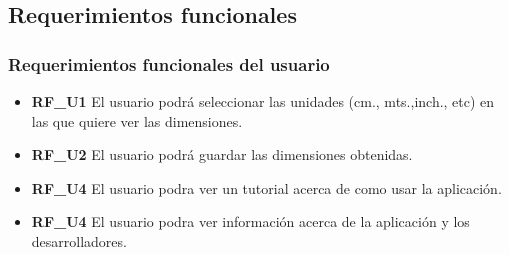 \subsection{Requerimientos funcionales}
\subsubsection{Requerimientos funcionales del usuario}

\begin{itemize}
\item \textbf{RF\_U1} El usuario podrá seleccionar las unidades (cm., mts.,inch., etc) en las que quiere ver las dimensiones.
\item \textbf{RF\_U2} El usuario podrá guardar las dimensiones obtenidas.


\item \textbf{RF\_U4} El usuario podra ver un tutorial acerca de como usar la aplicación.
\item \textbf{RF\_U4} El usuario podra ver información acerca de la aplicación y los desarrolladores.
\end{itemize}